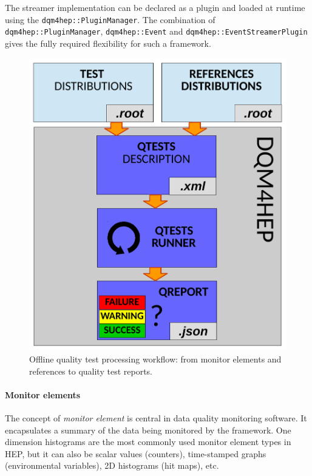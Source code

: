 \documentclass{webofc}
\begin{document}
The streamer implementation can be declared as a plugin and loaded at runtime using the \texttt{dqm4hep::PluginManager}.
The combination of \texttt{dqm4hep::PluginManager}, \texttt{dqm4hep::Event} and \texttt{dqm4hep::EventStreamerPlugin} gives the fully required flexibility for such a framework.

{ %

\begin{figure}
    \includegraphics[width=\linewidth]{figs/QTestRunner.pdf}
    \caption{Offline quality test processing workflow: from monitor elements and references to quality test reports.}
    \label{fig:QTestsAndQReports}
\end{figure}

\paragraph{Monitor elements}

The concept of \textit{monitor element} is central in data quality monitoring software.
It encapsulates a summary of the data being monitored by the framework.
One dimension histograms are the most commonly used monitor element types in HEP, but it can also be scalar values (counters), time-stamped graphs (environmental variables), 2D histograms (hit maps), etc.

}
\end{document}
